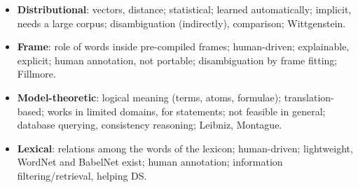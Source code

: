 \begin{nbsummary}
\begin{itemize}[nosep]
  \item \textbf{Distributional}: vectors, distance; statistical; learned automatically;
        implicit, needs a large corpus; disambiguation (indirectly), comparison;
        Wittgenstein.
  \item \textbf{Frame}: role of words inside pre-compiled frames; human-driven;
        explainable, explicit; human annotation, not portable; disambiguation by frame
        fitting; Fillmore.
  \item \textbf{Model-theoretic}: logical meaning (terms, atoms, formulae);
        translation-based; works in limited domains, for statements; not feasible in
        general; database querying, consistency reasoning; Leibniz, Montague.
  \item \textbf{Lexical}: relations among the words of the lexicon; human-driven;
        lightweight, WordNet and BabelNet exist; human annotation; information
        filtering/retrieval, helping DS.
\end{itemize}
\end{nbsummary}
